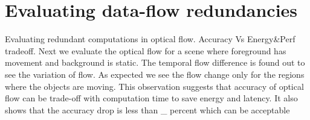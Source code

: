 \section{Evaluating data-flow redundancies}
Evaluating redundant computations in optical flow. 
Accuracy Vs Energy\&Perf tradeoff. 
Next we evaluate the optical flow for a scene where foreground has movement and background is static. The temporal flow difference is found out to see the variation of flow. As expected we see the flow change only for the regions where the objects are moving. This observation suggests that accuracy of optical flow can be trade-off with computation time to save energy and latency. It also shows that the accuracy drop is less than \_ percent which can be acceptable


